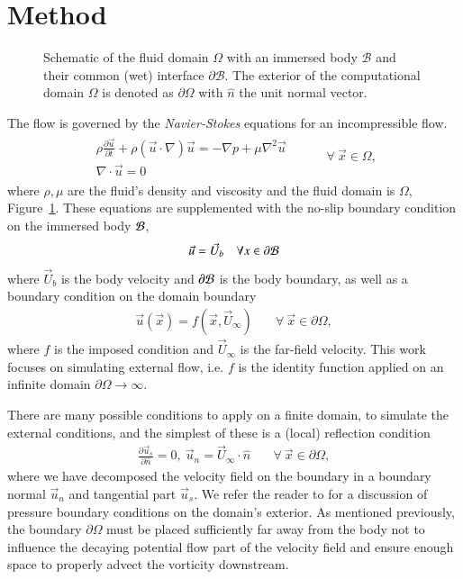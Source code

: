 \documentclass[final,1p,times]{elsarticle}
\begin{document}
\section{Method}

\begin{figure}
    \centering
    \def\svgwidth{0.5\columnwidth}
    
    \caption{Schematic of the fluid domain $\Omega$ with an immersed body $\mathcal{B}$ and their common (wet) interface $\partial\mathcal{B}$. The exterior of the computational domain $\Omega$ is denoted as $\partial\Omega$ with $\hat{n}$ the unit normal vector.}
    \label{Fig_1}
\end{figure}

The flow is governed by the \emph{Navier-Stokes} equations for an incompressible flow. 
\begin{align}
    \begin{array}{c}
     \rho\frac{\partial\vec{u}}{\partial t} +\rho\left(\vec{u}\cdot\nabla\right)\vec{u} = -\nabla p + \mu\nabla^2\vec{u}\\
    \nabla\cdot\vec{u}=0  
    \end{array}
 & \quad\quad\forall\ \vec{x}\in\Omega,
\end{align}
where $\rho,\mu$ are the fluid's density and viscosity and the fluid domain is $\Omega$, Figure~\ref{Fig_1}. These equations are supplemented with the no-slip boundary condition on the immersed body $\cal B$,
\begin{equation}
    \vec{u} = \vec{U}_b \quad \forall x \in \partial\cal{B}
\end{equation} 
where $\vec{U}_b$ is the body velocity and $\partial\cal{B}$ is the body boundary, as well as a boundary condition on the domain boundary
\begin{align}
    \vec u(\vec x) = f(\vec x,\vec U_\infty) &\quad\forall\ \vec{x}\in\partial\Omega,
\end{align}
where $f$ is the imposed condition and $\vec U_\infty$ is the far-field velocity. This work focuses on simulating external flow, i.e. $f$ is the identity function applied on an infinite domain $\partial\Omega\rightarrow\infty$.

There are many possible conditions to apply on a finite domain, to simulate the external conditions, and the simplest of these is a (local) reflection condition
\begin{align}\label{eq:BC_1}
    \frac{\partial \vec{u}_s}{\partial \hat{n}} = 0,\ \vec{u}_n = \vec U_\infty\cdot \hat n &\quad\forall\ \vec{x}\in\partial\Omega,
\end{align}
where we have decomposed the velocity field on the boundary in a boundary normal $\vec{u}_n$ and tangential part $\vec{u}_s$. We refer the reader to \cite{Gresho1987} for a discussion of pressure boundary conditions on the domain's exterior.  As mentioned previously, the boundary $\partial\Omega$ must be placed sufficiently far away from the body not to influence the decaying potential flow part of the velocity field and ensure enough space to properly advect the vorticity downstream. 
\end{document}
